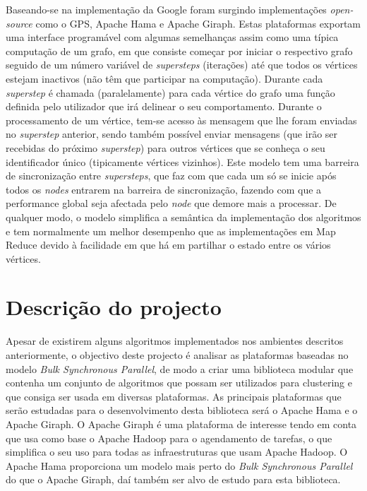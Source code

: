 Baseando-se na implementação da Google foram surgindo implementações \textit{open-source} como o GPS\cite{docgps}, Apache Hama\cite{hama} e Apache Giraph\cite{giraph}.
Estas plataformas exportam uma interface programável com algumas semelhanças assim como uma típica computação de um grafo, em que consiste começar por iniciar o respectivo grafo seguido de um número variável de \textit{supersteps} (iterações) até que todos os vértices estejam inactivos (não têm que participar na computação).
Durante cada \textit{superstep} é chamada (paralelamente) para cada vértice do grafo uma função definida pelo utilizador que irá delinear o seu comportamento.
Durante o processamento de um vértice, tem-se acesso às mensagem que lhe foram enviadas no \textit{superstep} anterior, sendo também possível enviar mensagens (que irão ser recebidas do próximo \textit{superstep}) para outros vértices que se conheça o seu identificador único (tipicamente vértices vizinhos).
Este modelo tem uma barreira de sincronização entre \textit{supersteps}, que faz com que cada um só se inicie após todos os \textit{nodes} entrarem na barreira de sincronização, fazendo com que a performance global seja afectada pelo \textit{node} que demore mais a processar.
De qualquer modo, o modelo simplifica a semântica da implementação dos algoritmos e tem normalmente um melhor desempenho que as implementações em Map Reduce devido à facilidade em que há em partilhar o estado entre os vários vértices. 


\section{Descrição do projecto}
Apesar de existirem alguns algoritmos implementados nos ambientes descritos anteriormente, o objectivo deste projecto é analisar as plataformas
baseadas no modelo \textit{Bulk Synchronous Parallel}, de modo a criar uma biblioteca modular que contenha um conjunto de algoritmos que possam ser utilizados para clustering e que consiga
ser usada em diversas plataformas. As principais plataformas que serão estudadas para o desenvolvimento desta biblioteca será o Apache Hama e o Apache Giraph. 
O Apache Giraph é uma plataforma de interesse tendo em conta que usa como base o Apache Hadoop para o agendamento de tarefas, o que simplifica o seu uso
para todas as infraestruturas que usam Apache Hadoop. O Apache Hama proporciona um modelo mais perto do \textit{Bulk Synchronous Parallel} do que o Apache Giraph, daí também ser
alvo de estudo para esta biblioteca.


